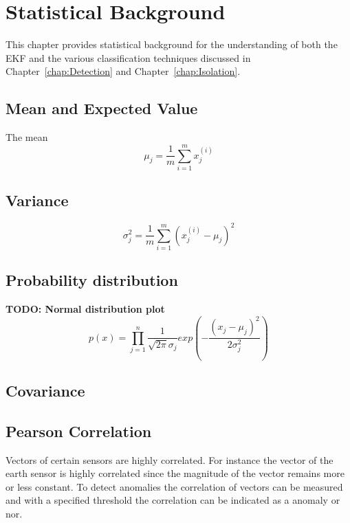 \chapter{Statistical Background}
\label{chap:StatsBack}
This chapter provides statistical background for the understanding of both the EKF and the various classification techniques discussed in Chapter~\ref{chap:Detection} and Chapter~\ref{chap:Isolation}.

\section{Mean and Expected Value}
The mean
\begin{equation}
\label{mean}
\mu_j = \frac{1}{m} \sum_{i=1}^{m}x_j^{(i)}
\end{equation}

\section{Variance}
\begin{equation}
\label{variance}
\sigma_j^2 = \frac{1}{m} \sum_{i=1}^{m}(x_j^{(i)} - \mu_j)^2
\end{equation}

\section{Probability distribution}
\textbf{TODO: Normal distribution plot}
\begin{equation}
\label{guassian distribution}
p(x) = \prod_{j=1}^{n} \frac{1}{\sqrt{2\pi}\sigma_j}exp(-\frac{(x_j-\mu_j)^2}{2\sigma_j^2})
\end{equation}

\section{Covariance}

\section{Pearson Correlation}
Vectors of certain sensors are highly correlated. For instance the vector of the earth sensor is highly correlated since the magnitude of the vector remains more or less constant. To detect anomalies the correlation of vectors can be measured and with a specified threshold the correlation can be indicated as a anomaly or nor.

